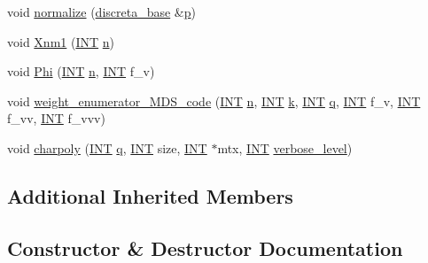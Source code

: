 \begin{DoxyCompactItemize}
\item 
void \mbox{\hyperlink{classunipoly_a1fdf6f2da235edcf45fca433dea19370}{normalize}} (\mbox{\hyperlink{classdiscreta__base}{discreta\+\_\+base}} \&\mbox{\hyperlink{alphabet2_8_c_a533391314665d6bf1b5575e9a9cd8552}{p}})
\item 
void \mbox{\hyperlink{classunipoly_a6804952878b88dc700e6532a5c9b1e6e}{Xnm1}} (\mbox{\hyperlink{galois_8h_a09fddde158a3a20bd2dcadb609de11dc}{I\+NT}} \mbox{\hyperlink{simeon_8_c_a7f2cd26777ce0ff3fdaf8d02aacbddfb}{n}})
\item 
void \mbox{\hyperlink{classunipoly_a50f2edff215daebf54b1e010d99f630d}{Phi}} (\mbox{\hyperlink{galois_8h_a09fddde158a3a20bd2dcadb609de11dc}{I\+NT}} \mbox{\hyperlink{simeon_8_c_a7f2cd26777ce0ff3fdaf8d02aacbddfb}{n}}, \mbox{\hyperlink{galois_8h_a09fddde158a3a20bd2dcadb609de11dc}{I\+NT}} f\+\_\+v)
\item 
void \mbox{\hyperlink{classunipoly_ad9a4b7b883285271fc39528f74755a07}{weight\+\_\+enumerator\+\_\+\+M\+D\+S\+\_\+code}} (\mbox{\hyperlink{galois_8h_a09fddde158a3a20bd2dcadb609de11dc}{I\+NT}} \mbox{\hyperlink{simeon_8_c_a7f2cd26777ce0ff3fdaf8d02aacbddfb}{n}}, \mbox{\hyperlink{galois_8h_a09fddde158a3a20bd2dcadb609de11dc}{I\+NT}} \mbox{\hyperlink{classdiscreta__base_a6f7a0f7bdd115b9e4dde358cfa7ebf81}{k}}, \mbox{\hyperlink{galois_8h_a09fddde158a3a20bd2dcadb609de11dc}{I\+NT}} \mbox{\hyperlink{simeon_8_c_a92cbb483a3b27ae1a0dbfcb125ce216f}{q}}, \mbox{\hyperlink{galois_8h_a09fddde158a3a20bd2dcadb609de11dc}{I\+NT}} f\+\_\+v, \mbox{\hyperlink{galois_8h_a09fddde158a3a20bd2dcadb609de11dc}{I\+NT}} f\+\_\+vv, \mbox{\hyperlink{galois_8h_a09fddde158a3a20bd2dcadb609de11dc}{I\+NT}} f\+\_\+vvv)
\item 
void \mbox{\hyperlink{classunipoly_a788dc8f7be5c5c4c347959a9155ddb80}{charpoly}} (\mbox{\hyperlink{galois_8h_a09fddde158a3a20bd2dcadb609de11dc}{I\+NT}} \mbox{\hyperlink{simeon_8_c_a92cbb483a3b27ae1a0dbfcb125ce216f}{q}}, \mbox{\hyperlink{galois_8h_a09fddde158a3a20bd2dcadb609de11dc}{I\+NT}} size, \mbox{\hyperlink{galois_8h_a09fddde158a3a20bd2dcadb609de11dc}{I\+NT}} $\ast$mtx, \mbox{\hyperlink{galois_8h_a09fddde158a3a20bd2dcadb609de11dc}{I\+NT}} \mbox{\hyperlink{simeon_8_c_a818073fbcc2f439e7c56952f67386122}{verbose\+\_\+level}})
\end{DoxyCompactItemize}
\subsection*{Additional Inherited Members}


\subsection{Constructor \& Destructor Documentation}
\mbox{\label{classunipoly_adf6c81c7b9f7d4c110a04c4a5681695c}} 
